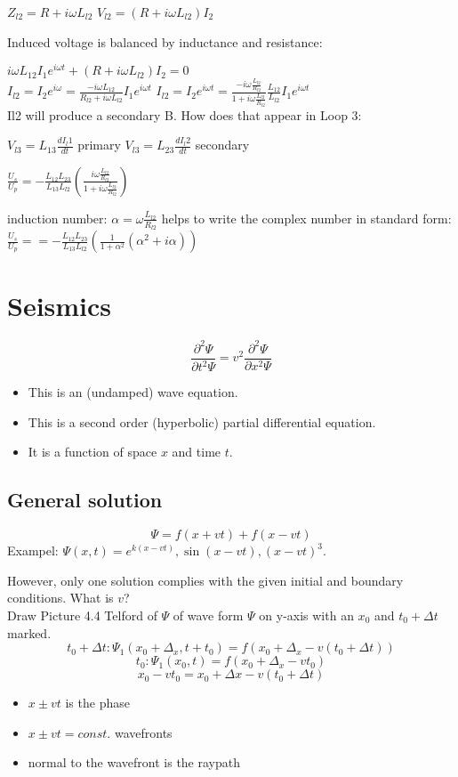 \documentclass[a4paper,12pt,fleqn]{article}
\begin{document}
$Z_{l2} = R + i\omega L_{l2}$
$V_{l2} = (R + i\omega L_{l2})I_2$

Induced voltage is balanced by inductance and resistance:

$i \omega L_{12} I_1 e^{i\omega t} + (R + i\omega L_{l2})I_2 = 0$\\
$I_{l2} = I_2e^{i\omega } = \frac{-i\omega L_{12}}{R_{l2}+i\omega L_{l2}}I_1e^{i\omega t}$
$I_{l2} = I_2e^{i\omega t} = \frac{-i\omega \frac{L_{l2}}{R_{l2}}}{1+i\omega \frac{L_{l2}}{R_{l2}}}\frac{L_{12}}{L_{l2}}I_1e^{i\omega t}$\\

Il2 will produce a secondary B. How does that appear in Loop 3:

$V_{l3} = L_{13}\frac{dI_l1}{dt}$ primary
$V_{l3} = L_{23}\frac{dI_l2}{dt}$ secondary

$\frac{U_s}{U_p}= -\frac{L_{12}L_{23}}{L_{13}L_{l2}}\left(\frac{i\omega \frac{L_{l2}}{R_{l2}}}{1+i\omega\frac{L_{l2}}{R_{l2}}}\right)$

induction number:
$
\alpha = \omega \frac{L_{l2}}{R_{l2}}
$
helps to write the complex number in standard form:
$\frac{U_s}{U_p}== -\frac{L_{12}L_{23}}{L_{13}L_{l2}} \left(\frac{1}{1+\alpha^2}(\alpha^2+i\alpha) \right)$

\section{Seismics}
$$
\frac{\partial^2 \Psi}{\partial t^2 \Psi} = v^2 \frac{\partial^2 \Psi}{\partial x^2 \Psi}
$$
\begin{itemize}
  \item This is an (undamped) wave equation.
  \item This is a second order (hyperbolic) partial differential equation.
  \item It is a function of space $x$ and time $t$.
\end{itemize}
\subsection{General solution}
$$\Psi = f(x+vt) + f(x-vt)$$
Exampel: $\Psi(x,t) = e^{k(x-vt)}, \sin(x-vt), (x-vt)^3$.

However, only one solution complies with the given initial and boundary conditions. What is $v$?
\\
Draw Picture 4.4 Telford of $\Psi$  of wave form $\Psi$ on y-axis with an $x_0$ and $t_0+\Delta t$ marked. 
\\
$$t_0+\Delta t: \Psi_1(x_0+\Delta_x,t+t_0) = f(x_0+\Delta_x-v(t_0+\Delta t))$$
$$t_0: \Psi_1(x_0,t) = f(x_0+\Delta_x-vt_0)$$
$$
x_0 - vt_0 = x_0 + \Delta x -v(t_0+\Delta t)
$$
\begin{itemize}
\item $x \pm vt$ is the phase
\item $x \pm vt = const.$  wavefronts
\item normal to the wavefront is the raypath
\end{itemize}
\end{document}
